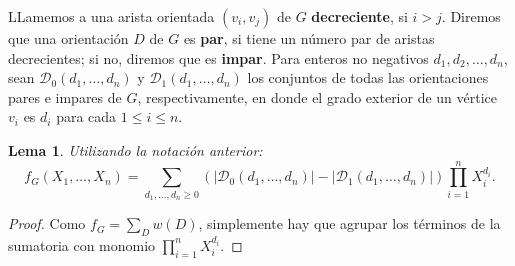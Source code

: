 \documentclass[12pt]{report}
\theoremstyle{plain}
\newtheorem{lemma}[theorem]{Lema}
\theoremstyle{definition}
\newcommand{\abs}[1]{\left \vert #1 \right \vert}
\begin{document}
LLamemos a una arista orientada $(v_i,v_j)$ de $G$ \textbf{decreciente}, si $i > j$. Diremos que una orientación $D$ de $G$ es \textbf{par}, si tiene un número par de aristas decrecientes; si no, diremos que es \textbf{impar}. Para enteros no negativos $d_1,d_2, \ldots, d_n$, sean $\mathcal D _0 (d_1, \ldots, d_n)$ y $\mathcal D _1 (d_1, \ldots, d_n)$ los conjuntos de todas las orientaciones pares e impares de $G$, respectivamente, en donde el grado exterior de un vértice $v_i$ es $d_i$ para cada $1 \leq i \leq n$.

\begin{lemma}
Utilizando la notación anterior:
\[
f_G (X_1, \ldots, X_n) = \sum_{d_1, \ldots, d_n \geq 0} (\abs{\mathcal D _0 (d_1, \ldots, d_n)} - \abs{\mathcal D _1 (d_1, \ldots,d_n)}) \prod_{i = 1}^n X_i^{d_i}.
\]
\end{lemma}
\begin{proof}
Como $f_G = \sum_{D} w(D)$, simplemente hay que agrupar los términos de la sumatoria con monomio $\prod_{i = 1}^n X_i^{d_i}$.
\end{proof}
\end{document}
